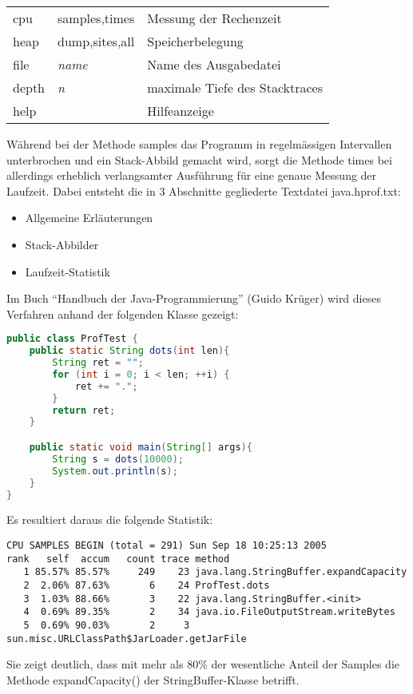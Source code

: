 \begin{tabular}{lll}
cpu & samples,times & Messung der Rechenzeit \\
heap & dump,sites,all & Speicherbelegung\\
file & {\em name} & Name des Ausgabedatei \\
depth & {\em n}   & maximale Tiefe des Stacktraces \\
help &           & Hilfeanzeige \\
\end{tabular}

Während bei der Methode samples das Programm in regelmässigen
Intervallen unterbrochen und ein Stack-Abbild gemacht wird, sorgt die Methode
times bei allerdings erheblich verlangsamter Ausführung für eine genaue
Messung der Laufzeit.
\ifslides
\newpage
\fi
Dabei entsteht die in 3 Abschnitte gegliederte Textdatei
java.hprof.txt:
\begin{itemize}
\item Allgemeine Erläuterungen
\item Stack-Abbilder
\item Laufzeit-Statistik
\end{itemize}
\ifslides
\newpage
\else
Im Buch ``Handbuch der Java-Programmierung'' (Guido Krüger) wird dieses
Verfahren anhand der folgenden Klasse gezeigt:
\fi
\begin{lstlisting}[language=java]
public class ProfTest {
    public static String dots(int len){
        String ret = "";
        for (int i = 0; i < len; ++i) {
            ret += ".";
        }
        return ret;
    }

    public static void main(String[] args){
        String s = dots(10000);
        System.out.println(s);
    }
}
\end{lstlisting}
\ifslides
\newpage
\fi
Es resultiert daraus die folgende Statistik:
{
\ifslides\footnotesize
\else\small
\fi
\begin{lstlisting}
CPU SAMPLES BEGIN (total = 291) Sun Sep 18 10:25:13 2005
rank   self  accum   count trace method
   1 85.57% 85.57%     249    23 java.lang.StringBuffer.expandCapacity
   2  2.06% 87.63%       6    24 ProfTest.dots
   3  1.03% 88.66%       3    22 java.lang.StringBuffer.<init>
   4  0.69% 89.35%       2    34 java.io.FileOutputStream.writeBytes
   5  0.69% 90.03%       2     3 sun.misc.URLClassPath$JarLoader.getJarFile

\end{lstlisting}
}
\ifslides
\newpage
\else
Sie zeigt deutlich, dass mit mehr als 80\% der wesentliche Anteil der Samples
die Methode expandCapacity() der StringBuffer-Klasse betrifft.

